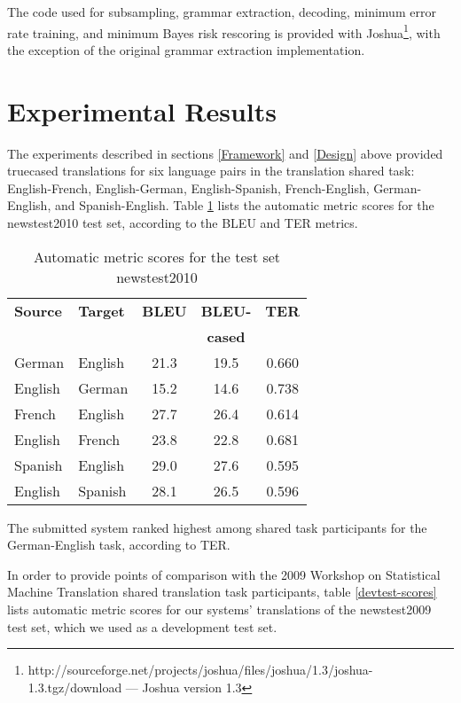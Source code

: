 \documentclass[11pt, a4paper]{article}
\begin{document}
The code used for subsampling, grammar extraction, decoding, minimum error rate training, and minimum Bayes risk rescoring is provided with Joshua\footnote{http://sourceforge.net/projects/joshua/files/joshua/1.3/joshua-1.3.tgz/download --- Joshua version 1.3}, with the exception of the original \cite{Lopez2008} grammar extraction implementation.










\section{Experimental Results}
\label{Results}

The experiments described in sections \ref{Framework} and \ref{Design} above provided truecased translations for six language pairs in the translation shared task: English-French, English-German, English-Spanish, French-English, German-English, and Spanish-English. Table \ref{scores} lists the automatic metric scores for the newstest2010 test set, according to the BLEU \cite{Papineni2002} and TER \cite{TER} metrics. 

\begin{table}[h]
\begin{center}
\begin{tabular}{|l|l||c|c|c|}
\hline
\bf Source & \bf Target & \bf BLEU & \bf BLEU- & \bf TER \\
& & & \bf cased & \\
\hline
German & English & 21.3 & 19.5 & 0.660 \\ \hline
English & German & 15.2  & 14.6  & 0.738 \\ \hline
French & English & 27.7 & 26.4 & 0.614 \\ \hline
English & French & 23.8 & 22.8 & 0.681 \\ \hline
Spanish & English & 29.0 & 27.6 & 0.595 \\ \hline
English & Spanish & 28.1 & 26.5 & 0.596  \\ \hline
\end{tabular}
\end{center}
\caption{\label{scores} Automatic metric scores for the test set newstest2010 }
\end{table}

The submitted system ranked highest among shared task participants for the German-English task, according to TER.

In order to provide points of comparison with the 2009 Workshop on Statistical Machine Translation shared translation task participants,  table \ref{devtest-scores} lists automatic metric scores for our systems' translations of the newstest2009 test set, which we used as a development test set.
\end{document}
